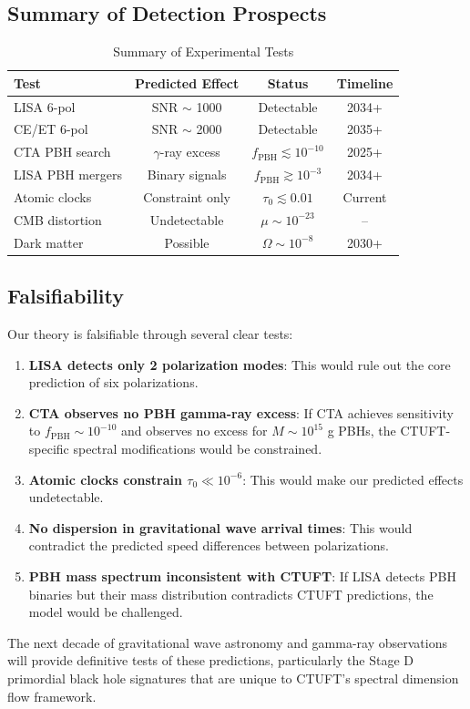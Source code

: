 \subsection{Summary of Detection Prospects}

\begin{table}[htbp]
\centering
\caption{Summary of Experimental Tests}
\label{tab:detection_summary}
\begin{tabular}{lccc}
\hline
\textbf{Test} & \textbf{Predicted Effect} & \textbf{Status} & \textbf{Timeline} \\
\hline
LISA 6-pol & SNR $\sim$ 1000 & Detectable & 2034+ \\
CE/ET 6-pol & SNR $\sim$ 2000 & Detectable & 2035+ \\
CTA PBH search & $\gamma$-ray excess & $f_{\text{PBH}} \lesssim 10^{-10}$ & 2025+ \\
LISA PBH mergers & Binary signals & $f_{\text{PBH}} \gtrsim 10^{-3}$ & 2034+ \\
Atomic clocks & Constraint only & $\tau_0 \lesssim 0.01$ & Current \\
CMB distortion & Undetectable & $\mu \sim 10^{-23}$ & -- \\
Dark matter & Possible & $\Omega \sim 10^{-8}$ & 2030+ \\
\hline
\end{tabular}
\end{table}

\subsection{Falsifiability}

Our theory is falsifiable through several clear tests:

\begin{enumerate}
    \item \textbf{LISA detects only 2 polarization modes}: This would rule out the core prediction of six polarizations.
    
    \item \textbf{CTA observes no PBH gamma-ray excess}: If CTA achieves sensitivity to $f_{\text{PBH}} \sim 10^{-10}$ and observes no excess for $M \sim 10^{15}$ g PBHs, the CTUFT-specific spectral modifications would be constrained.
    
    \item \textbf{Atomic clocks constrain $\tau_0 \ll 10^{-6}$}: This would make our predicted effects undetectable.
    
    \item \textbf{No dispersion in gravitational wave arrival times}: This would contradict the predicted speed differences between polarizations.
    
    \item \textbf{PBH mass spectrum inconsistent with CTUFT}: If LISA detects PBH binaries but their mass distribution contradicts CTUFT predictions, the model would be challenged.
\end{enumerate}

The next decade of gravitational wave astronomy and gamma-ray observations will provide definitive tests of these predictions, particularly the Stage D primordial black hole signatures that are unique to CTUFT's spectral dimension flow framework.
